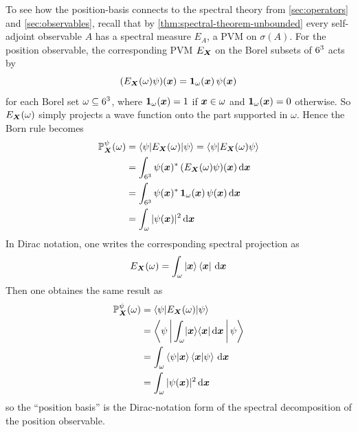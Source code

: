 \begin{digression}
To see how the position-basis connects to the spectral theory from \autoref{sec:operators} and \autoref{sec:observables}, 
recall that by \autoref{thm:spectral-theorem-unbounded} every self-adjoint observable \(A\) has a spectral measure \(E_A\),
a PVM on \(\sigma(A)\).
For the position observable, the corresponding PVM \(E_{{\boldsymbol{X}}}\) on the Borel subsets of \(6^3\) acts by
\[
(E_{{\boldsymbol{X}}}(\omega)\psi)({\boldsymbol{x}})
=
\mathbf{1}_{\omega}({\boldsymbol{x}})\,\psi({\boldsymbol{x}})
\]
for each Borel set \(\omega\subseteq6^3\),
where 
 \(\mathbf{1}_{\omega}({\boldsymbol{x}})=1\) if \({\boldsymbol{x}}\in\omega\) and \(\mathbf{1}_{\omega}({\boldsymbol{x}})=0\) otherwise.
So \(E_{{\boldsymbol{X}}}(\omega)\) simply projects a wave function onto the part supported in \(\omega\).
Hence the Born rule becomes
\[
\begin{aligned}
\operatorname{\mathbb{P}}_{{\boldsymbol{X}}}^{\psi}(\omega)
&=
\braket{\psi | E_{{\boldsymbol{X}}}(\omega) | \psi}
=
\braket{\psi | E_{{\boldsymbol{X}}}(\omega)\psi}
\\
&=
\int_{6^3} \psi({\boldsymbol{x}})^*\,(E_{{\boldsymbol{X}}}(\omega)\psi)({\boldsymbol{x}})\,\mathrm{d}{\boldsymbol{x}}
\\
&=
\int_{6^3} \psi({\boldsymbol{x}})^*\,\mathbf{1}_{\omega}({\boldsymbol{x}})\,\psi({\boldsymbol{x}})\,\mathrm{d}{\boldsymbol{x}}
\\
&=
\int_{\omega}|\psi({\boldsymbol{x}})|^2\,\mathrm{d}{\boldsymbol{x}}
\end{aligned}
\]
In Dirac notation, one writes the corresponding spectral projection as
\[
E_{{\boldsymbol{X}}}(\omega)
=
\int_{\omega}\ket{{\boldsymbol{x}}}\bra{{\boldsymbol{x}}}\,\mathrm{d}{\boldsymbol{x}}
\]
Then one obtaines the same result as
\[
\begin{aligned}
\operatorname{\mathbb{P}}_{{\boldsymbol{X}}}^{\psi}(\omega)
&=
\braket{\psi|E_{{\boldsymbol{X}}}(\omega)|\psi}
\\
&=
\Braket{\psi|\int_{\omega}\lvert{\boldsymbol{x}}\rangle \langle{\boldsymbol{x}}\rvert\,\mathrm{d}{\boldsymbol{x}}|\psi}
\\
&=
\int_{\omega}\braket{\psi|{\boldsymbol{x}}}\braket{{\boldsymbol{x}}|\psi}\,\mathrm{d}{\boldsymbol{x}}
\\
&=
\int_{\omega}|\psi({\boldsymbol{x}})|^2\,\mathrm{d}{\boldsymbol{x}}
\end{aligned}
\]
so the ``position basis'' is the Dirac-notation form of the spectral decomposition of the position observable.

\end{digression}
